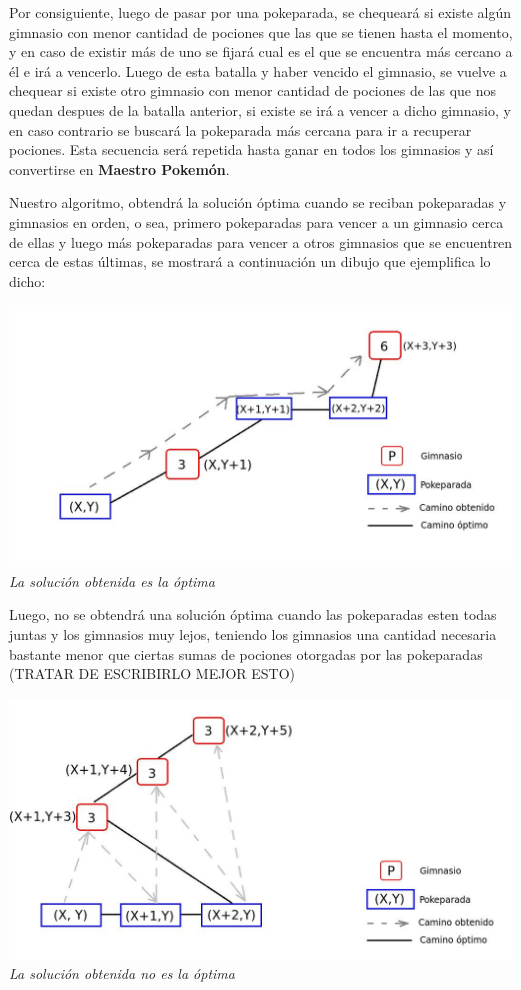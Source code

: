 Por consiguiente, luego de pasar por una pokeparada, se chequear\'a si existe alg\'un gimnasio con menor cantidad de pociones que las que se tienen hasta el momento, y en caso de existir m\'as de uno se fijar\'a cual es el que se encuentra m\'as cercano a \'el e ir\'a a vencerlo. Luego de esta batalla y haber vencido el gimnasio, se vuelve a chequear si existe otro gimnasio con menor cantidad de pociones de las que nos quedan despues de la batalla anterior, si existe se ir\'a a vencer a dicho gimnasio, y en caso contrario se buscar\'a la pokeparada m\'as cercana para ir a recuperar pociones. Esta secuencia ser\'a repetida hasta ganar en todos los gimnasios y as\'i convertirse en \textbf{Maestro Pokem\'on}.

Nuestro algoritmo, obtendr\'a la soluci\'on \'optima cuando se reciban pokeparadas y gimnasios en orden, o sea, primero pokeparadas para vencer a un gimnasio cerca de ellas y luego m\'as pokeparadas para vencer a otros gimnasios que se encuentren cerca de estas \'ultimas, se mostrar\'a a continuaci\'on un dibujo que ejemplifica lo dicho:

\vspace*{0.3cm} \vspace*{0.3cm}
  \begin{center}
\includegraphics[scale=0.60]{./EJ2/optima.jpeg}
\\{\textit{La soluci\'on obtenida es la \'optima}}
  \end{center}
  \vspace*{0.3cm}

Luego, no se obtendr\'a una soluci\'on \'optima cuando las pokeparadas esten todas juntas y los gimnasios muy lejos, teniendo los gimnasios una cantidad necesaria bastante menor que ciertas sumas de pociones otorgadas por las pokeparadas (TRATAR DE ESCRIBIRLO MEJOR ESTO)

\vspace*{0.3cm} \vspace*{0.3cm}
  \begin{center}
\includegraphics[scale=0.60]{./EJ2/nooptima.jpeg}
\\{\textit{La soluci\'on obtenida no es la \'optima}}
  \end{center}
  \vspace*{0.3cm}